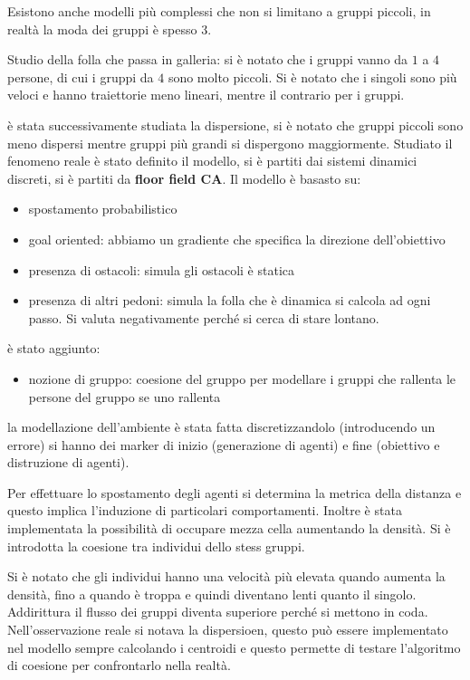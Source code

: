 Esistono anche modelli più complessi che non si limitano a gruppi piccoli, in realtà 
la moda dei gruppi è spesso $3$.

Studio della folla che passa in galleria: si è notato che i gruppi vanno da $1$ a $4$
persone, di cui i gruppi da $4$ sono molto piccoli. Si è notato che i singoli sono 
più veloci e hanno traiettorie meno lineari, mentre il contrario per i gruppi.

è stata successivamente studiata la dispersione, si è notato che gruppi piccoli
sono meno dispersi mentre gruppi più grandi si dispergono maggiormente. Studiato
il fenomeno reale è stato definito il modello, si è partiti dai sistemi 
dinamici discreti, si è partiti da \textbf{floor field CA}. Il modello 
è basasto su:
\begin{itemize}
    \item spostamento probabilistico
    \item goal oriented: abbiamo un gradiente che specifica la direzione dell'obiettivo
    \item presenza di ostacoli: simula gli ostacoli è statica
    \item presenza di altri pedoni: simula la folla che è dinamica si calcola ad 
    ogni passo. Si valuta negativamente perché si cerca di stare lontano.
\end{itemize}
è stato aggiunto:
\begin{itemize}
    \item nozione di gruppo: coesione del gruppo per modellare i gruppi che 
    rallenta le persone del gruppo se uno rallenta
\end{itemize}
la modellazione dell'ambiente è stata fatta discretizzandolo (introducendo un errore)
si hanno dei marker di inizio (generazione di agenti) e fine (obiettivo e distruzione di agenti). 

Per effettuare lo spostamento degli agenti si determina la metrica della distanza 
e questo implica l'induzione di particolari comportamenti. Inoltre è stata implementata 
la possibilità di occupare mezza cella aumentando la densità. Si è introdotta la 
coesione tra individui dello stess gruppi.

Si è notato che gli individui hanno una velocità più elevata quando aumenta la densità,
fino a quando è troppa e quindi diventano lenti quanto il singolo. Addirittura 
il flusso dei gruppi diventa superiore perché si mettono in coda.
Nell'osservazione reale si notava la dispersioen, questo può essere implementato 
nel modello sempre calcolando i centroidi e questo permette di testare l'algoritmo 
di coesione per confrontarlo nella realtà.

